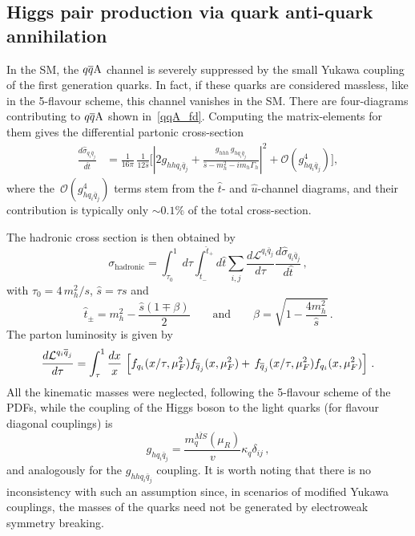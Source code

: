 \subsection{Higgs pair production via quark anti-quark annihilation}
\par In the SM, the $\qqA$ channel is severely suppressed by the small Yukawa coupling of the first generation quarks.  In fact, if  these quarks are considered massless, like in the 5-flavour scheme, this channel vanishes in the SM.  There are four-diagrams contributing to $\qqA$ shown in~\autoref{qqA_fd}. Computing the matrix-elements for them gives the differential partonic cross-section 
\begin{align}
	\frac{d \hat \sigma_{q_i\bar{q}_j}}{d \hat t} &= \frac{1}{16 \pi}\, \frac{1}{12  \hat{s}} \bigg[ \left| 2  g_{hh q_i \bar q_j} + \frac{g_{hhh}\, g_{h q_i \bar q_j}}{\hat{s}-m_h^2-im_h\Gamma_h}\right|^2+ \mathcal{O}(g_{h q_i \bar q_j}^4) \bigg],
	\label{sigmaqqa}
\end{align}
where the~$ \mathcal{O}(g_{h q_i \bar q_j}^4)$ terms stem from the $\hat{t}$- and $\hat{u}$-channel diagrams, and their contribution is typically only $\sim 0.1 \%$ of the total cross-section.
\par The hadronic cross section is then obtained by
\begin{equation}
	\sigma_{\mathrm{hadronic}} =  \int_{\tau_0}^1 d\tau \int_{\hat{t}_-}^{\hat{t}_+} d\hat{t} \sum_{i,j} \frac{d\mathcal{L}^{q_i\bar{q}_j}}{d\tau}\frac{ d\hat \sigma_{q_i\bar{q}_j}}{d \hat t}\,, \label{eq:sigmahadron}
\end{equation}
with $ \tau_0= 4\, m_h^2/s$, $\hat{s}=\tau s$ and
\begin{equation}
	\hat{t}_{\pm}=m_h^2-\frac{\hat{s}(1\mp \beta)}{2} \quad\quad \text{and}\quad \quad \beta=\sqrt{1-\frac{4 m_h^2}{\hat{s}}}\,.
\end{equation}
The parton luminosity is given by
\begin{equation}
	\frac{d{\cal L}^{q_i \bar q_j}}{d\tau} = \int_\tau ^1 \frac{dx}{x} \,\left[  f_{q_i}(x/\tau,\mu_F^2) f_{\bar{q}_j}(x,\mu_F^2) + \,f_{\bar{q}_j}(x/\tau,\mu_F^2) f_{q_i}(x,\mu_F^2)\right]\,.
\end{equation}
All the kinematic masses were neglected, following the 5-flavour scheme of the PDFs, while the coupling of the Higgs boson to the light quarks (for flavour diagonal couplings) is
\begin{equation}
	g_{hq_i\bar{q}_j}=\frac{m^{\bar{MS}}_q(\mu_R)}{v}  \kappa_q \delta_{ij}\,,
\end{equation}
and analogously for the $g_{hhq_i\bar{q}_j}$ coupling.  It is worth noting that there is no inconsistency with such an assumption since, in scenarios of modified Yukawa couplings, the masses of the quarks need not be generated by electroweak symmetry breaking.

